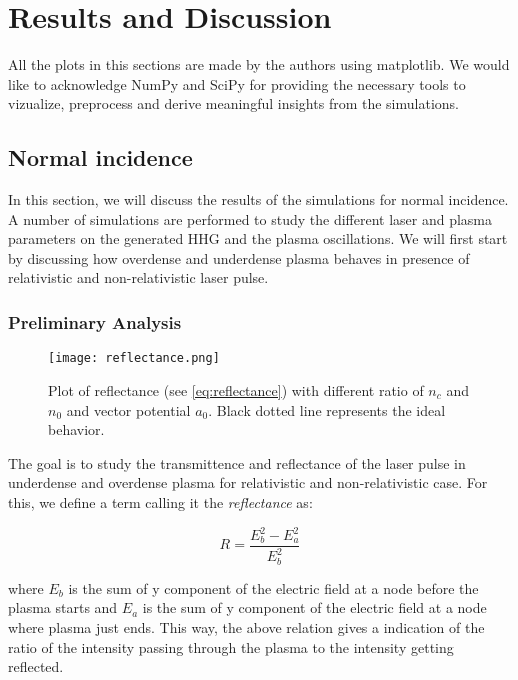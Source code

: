 \section{Results and Discussion}

All the plots in this sections are made by the authors using matplotlib\cite{matplotlib}. We would like to acknowledge NumPy\cite{numpy} and SciPy\cite{scipy} for providing the necessary tools to vizualize, preprocess and derive meaningful insights from the simulations.

\subsection{Normal incidence}
In this section, we will discuss the results of the simulations for normal incidence. A number of simulations are performed to study the different laser and plasma parameters on the generated HHG and the plasma oscillations. We will first start by discussing how overdense and underdense plasma behaves in presence of relativistic and non-relativistic laser pulse.

\subsubsection{Preliminary Analysis}

\begin{figure}[H]
    \centering
    \texttt{[image: reflectance.png]}
    \caption{Plot of reflectance (see \ref{eq:reflectance}) with different ratio of $n_c$ and $n_0$ and vector potential $a_0$. Black dotted line represents the ideal behavior.}
    \label{fig:reflectance}
\end{figure}

The goal is to study the transmittence and reflectance of the laser pulse in underdense and overdense plasma for relativistic and non-relativistic case. For this, we define a term calling it the \textit{reflectance} as:

\begin{equation}
    \label{eq:reflectance}
    R = \frac{{E_{b}^2}-{E_{a}^2}}{{E_{b}^2}}
\end{equation}

where $E_{b}$ is the sum of y component of the electric field at a node before the plasma starts and $E_{a}$ is the sum of y component of the electric field at a node where plasma just ends. This way, the above relation gives a indication of the ratio of the intensity passing through the plasma to the intensity getting reflected.

